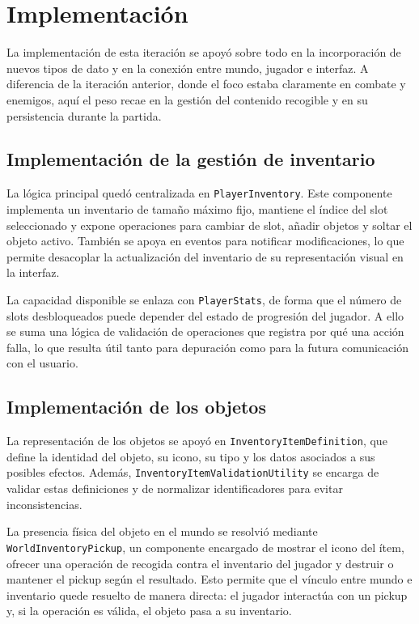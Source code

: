 \section{Implementación}
La implementación de esta iteración se apoyó sobre todo en la incorporación de nuevos tipos
de dato y en la conexión entre mundo, jugador e interfaz. A diferencia de la iteración
anterior, donde el foco estaba claramente en combate y enemigos, aquí el peso recae en la
gestión del contenido recogible y en su persistencia durante la partida.

\subsection{Implementación de la gestión de inventario}
La lógica principal quedó centralizada en \texttt{PlayerInventory}. Este componente
implementa un inventario de tamaño máximo fijo, mantiene el índice del slot seleccionado y
expone operaciones para cambiar de slot, añadir objetos y soltar el objeto activo. También
se apoya en eventos para notificar modificaciones, lo que permite desacoplar la actualización
del inventario de su representación visual en la interfaz.

La capacidad disponible se enlaza con \texttt{PlayerStats}, de forma que el número de slots
desbloqueados puede depender del estado de progresión del jugador. A ello se suma una lógica
de validación de operaciones que registra por qué una acción falla, lo que resulta útil
tanto para depuración como para la futura comunicación con el usuario.

\subsection{Implementación de los objetos}
La representación de los objetos se apoyó en \texttt{InventoryItemDefinition}, que define la
identidad del objeto, su icono, su tipo y los datos asociados a sus posibles efectos.
Además, \texttt{InventoryItemValidationUtility} se encarga de validar estas definiciones y
de normalizar identificadores para evitar inconsistencias.

La presencia física del objeto en el mundo se resolvió mediante \texttt{WorldInventoryPickup},
un componente encargado de mostrar el icono del ítem, ofrecer una operación de recogida
contra el inventario del jugador y destruir o mantener el pickup según el resultado. Esto
permite que el vínculo entre mundo e inventario quede resuelto de manera directa: el jugador
interactúa con un pickup y, si la operación es válida, el objeto pasa a su inventario.

